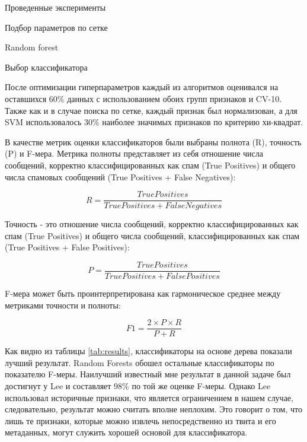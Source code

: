 \begin{section}{Проведенные эксперименты}
\begin{subsection}{Подбор параметров по сетке}
\begin{subsubsection}{Random forest}
\begin{table}[H]
  \caption{Подбор по сетке Random Forest}
  \label{grid:rf}
  \end{table}



\end{subsubsection}

\end{subsection}

\begin{subsection}{Выбор классификатора}

  После оптимизации гиперпараметров каждый из алгоритмов оценивался на оставшихся 60\% данных с использованием обоих групп признаков и CV-10. Также как и в случае поиска по сетке, каждый признак был нормализован, а для SVM использовалось 30\% наиболее значимых признаков по критерию хи-квадрат.


В качестве метрик оценки классификаторов были выбраны полнота (R), точность (P) и F-мера. Метрика полноты представляет из себя отношение числа сообщений, корректно классифицированных как спам (True Positives) и общего числа спамовых сообщений (True Positives + False Negatives):

\begin{equation}
  R = \frac{True Positives}{True Positives + False Negatives}
\end{equation}

Точность - это отношение числа сообщений, корректно классифицированных как спам (True Positives) и общего числа  сообщений, классифицированных как спам (True Positives + False Positives):

\begin{equation}
  P = \frac{True Positives}{True Positives + False Positives}
\end{equation}

F-мера может быть проинтерпретирована как гармоническое среднее между метриками точности и полноты:

\begin{equation}
  F1 = \frac{2 \times P \times R}{P + R}
\end{equation}

Как видно из таблицы \ref{tab:results}, классификаторы на основе дерева показали лучший результат. Random Forests обошел остальные классификаторы по показателю F-меры. Наилучший известный мне результат в данной задаче был достигнут у Lee \cite{Lee} и составляет 98\% по той же оценке F-меры. Однако Lee использовал историчные признаки, что является ограничением в нашем случае, следовательно, результат можно считать вполне неплохим. Это говорит о том, что лишь те признаки, которые можно извлечь непосредственно из твита и его метаданных,  могут служить хорошей основой для классификатора.



\end{subsection}
\end{section}
